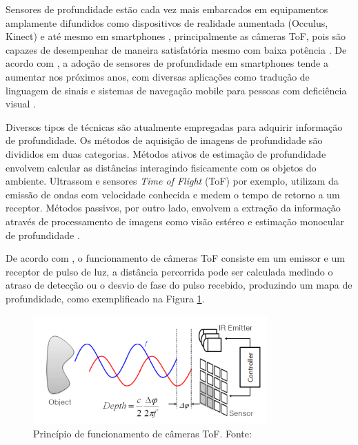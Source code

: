 
Sensores de profundidade estão cada vez mais embarcados em equipamentos amplamente difundidos como dispositivos de realidade aumentada (Occulus, Kinect) e até mesmo em smartphones \cite{du2020depthlab}, principalmente as câmeras ToF, pois são capazes de desempenhar de maneira satisfatória mesmo com baixa potência \cite{branscombe2018microsoft}. De acordo com \cite{xie2021ultradepth}, a adoção de sensores de profundidade em smartphones tende a aumentar nos próximos anos, com diversas aplicações como tradução de linguagem de sinais \cite{park2021enabling} e sistemas de navegação mobile para pessoas com deficiência visual \cite{see2022smartphone}. 

Diversos tipos de técnicas são atualmente empregadas para adquirir informação de profundidade. Os métodos de aquisição de imagens de profundidade são divididos em duas categorias. Métodos ativos de estimação de profundidade envolvem calcular as distâncias interagindo fisicamente com os objetos do ambiente. Ultrassom e sensores \textit{Time of Flight} (ToF) por exemplo, utilizam da emissão de ondas com velocidade conhecida e medem o tempo de retorno a um receptor. Métodos passivos, por outro lado, envolvem a extração da informação através de processamento de imagens como visão estéreo e estimação monocular de profundidade \cite{khan2020deep}. 

De acordo com , o funcionamento de câmeras ToF consiste em um emissor e um receptor de pulso de luz, a distância percorrida pode ser calculada medindo o atraso de detecção ou o desvio de fase do pulso recebido, produzindo um mapa de profundidade, como exemplificado na Figura \ref{fig:tof}. 

\begin{figure}[h]
    \centering   
    \includegraphics[width=0.8\textwidth]{fig/tof_cameras.png}
    \caption{Princípio de funcionamento de câmeras ToF. Fonte: \cite{hansard2012time}}
    \label{fig:tof}
\end{figure}

